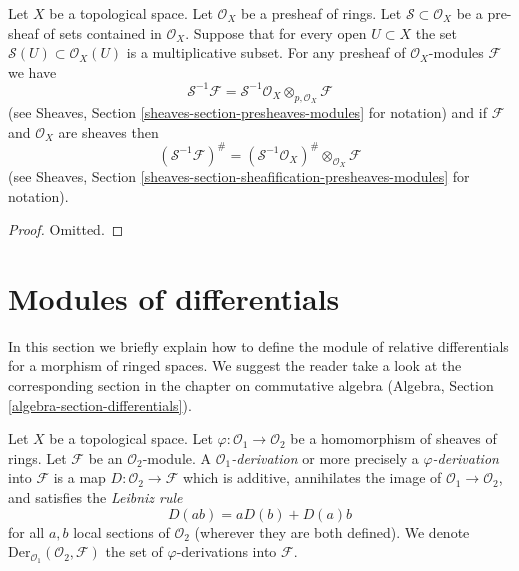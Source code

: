 \begin{lemma}
\label{lemma-simple-invert-module}
Let $X$ be a topological space.
Let $\mathcal{O}_X$ be a presheaf of rings.
Let $\mathcal{S} \subset \mathcal{O}_X$ be a pre-sheaf of sets contained
in $\mathcal{O}_X$. Suppose that for every open $U \subset X$ the set
$\mathcal{S}(U) \subset \mathcal{O}_X(U)$ is a multiplicative subset.
For any presheaf of $\mathcal{O}_X$-modules $\mathcal{F}$ we
have
$$
\mathcal{S}^{-1}\mathcal{F}
=
\mathcal{S}^{-1}\mathcal{O}_X \otimes_{p, \mathcal{O}_X} \mathcal{F}
$$
(see Sheaves, Section \ref{sheaves-section-presheaves-modules} for notation)
and if $\mathcal{F}$ and $\mathcal{O}_X$ are sheaves then
$$
(\mathcal{S}^{-1}\mathcal{F})^\#
=
(\mathcal{S}^{-1}\mathcal{O}_X)^\# \otimes_{\mathcal{O}_X} \mathcal{F}
$$
(see Sheaves, Section \ref{sheaves-section-sheafification-presheaves-modules}
for notation).
\end{lemma}

\begin{proof}
Omitted.
\end{proof}








\section{Modules of differentials}
\label{section-differentials}

\noindent
In this section we briefly explain how to define the module of relative
differentials for a morphism of ringed spaces. We suggest the reader take
a look at the corresponding section in the chapter on commutative algebra
(Algebra, Section \ref{algebra-section-differentials}).

\begin{definition}
\label{definition-derivation}
Let $X$ be a topological space. Let $\varphi : \mathcal{O}_1 \to \mathcal{O}_2$
be a homomorphism of sheaves of rings. Let $\mathcal{F}$ be an
$\mathcal{O}_2$-module. A {\it $\mathcal{O}_1$-derivation} or more precisely
a {\it $\varphi$-derivation} into $\mathcal{F}$ is a map
$D : \mathcal{O}_2 \to \mathcal{F}$ which is additive, annihilates the image
of $\mathcal{O}_1 \to \mathcal{O}_2$, and satisfies the
{\it Leibniz rule}
$$
D(ab) = aD(b) + D(a)b
$$
for all $a, b$ local sections of $\mathcal{O}_2$ (wherever they are both
defined). We denote $\text{Der}_{\mathcal{O}_1}(\mathcal{O}_2, \mathcal{F})$
the set of $\varphi$-derivations into $\mathcal{F}$.
\end{definition}

